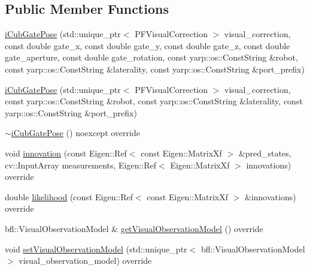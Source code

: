 \subsection*{Public Member Functions}
\begin{DoxyCompactItemize}
\item 
\hyperlink{classiCubGatePose_a3c06ef47eb5a0ccb0500828829fa3c31}{i\+Cub\+Gate\+Pose} (std\+::unique\+\_\+ptr$<$ P\+F\+Visual\+Correction $>$ visual\+\_\+correction, const double gate\+\_\+x, const double gate\+\_\+y, const double gate\+\_\+z, const double gate\+\_\+aperture, const double gate\+\_\+rotation, const yarp\+::os\+::\+Const\+String \&robot, const yarp\+::os\+::\+Const\+String \&laterality, const yarp\+::os\+::\+Const\+String \&port\+\_\+prefix)
\item 
\hyperlink{classiCubGatePose_a6b852c2c3b8c542b33d6b5e129f2ef54}{i\+Cub\+Gate\+Pose} (std\+::unique\+\_\+ptr$<$ P\+F\+Visual\+Correction $>$ visual\+\_\+correction, const yarp\+::os\+::\+Const\+String \&robot, const yarp\+::os\+::\+Const\+String \&laterality, const yarp\+::os\+::\+Const\+String \&port\+\_\+prefix)
\item 
\hyperlink{classiCubGatePose_a4c1d13f972ab4b9c778982964dae768d}{$\sim$i\+Cub\+Gate\+Pose} () noexcept override
\item 
void \hyperlink{classGatePose_a00607a4325dcfb7a02bda7490b65d25c}{innovation} (const Eigen\+::\+Ref$<$ const Eigen\+::\+Matrix\+Xf $>$ \&pred\+\_\+states, cv\+::\+Input\+Array measurements, Eigen\+::\+Ref$<$ Eigen\+::\+Matrix\+Xf $>$ innovations) override
\item 
double \hyperlink{classGatePose_a939c575d5d59c8b0f3ab528edd368c0d}{likelihood} (const Eigen\+::\+Ref$<$ const Eigen\+::\+Matrix\+Xf $>$ \&innovations) override
\item 
bfl\+::\+Visual\+Observation\+Model \& \hyperlink{classGatePose_aa47f9242f039b8752675db5594350a28}{get\+Visual\+Observation\+Model} () override
\item 
void \hyperlink{classGatePose_a18ba358c801ae1a246dbee2f9780c698}{set\+Visual\+Observation\+Model} (std\+::unique\+\_\+ptr$<$ bfl\+::\+Visual\+Observation\+Model $>$ visual\+\_\+observation\+\_\+model) override
\end{DoxyCompactItemize}
